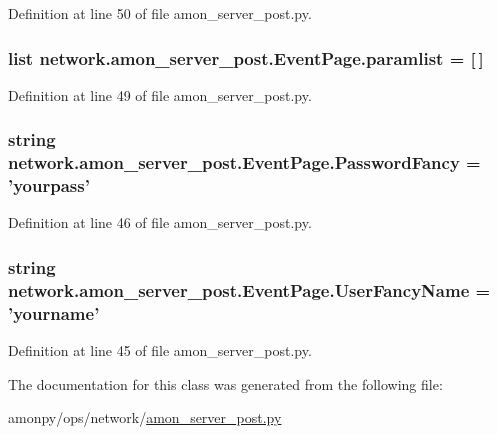 Definition at line 50 of file amon\-\_\-server\-\_\-post.\-py.

\hypertarget{classnetwork_1_1amon__server__post_1_1_event_page_a11cfef0e995347ffe8571f8be4dbc41a}{
\subsubsection[{paramlist}]{\setlength{\rightskip}{0pt plus 5cm}list network.\-amon\-\_\-server\-\_\-post.\-Event\-Page.\-paramlist = \mbox{[}$\,$\mbox{]}\hspace{0.3cm}{\ttfamily [static]}}}\label{classnetwork_1_1amon__server__post_1_1_event_page_a11cfef0e995347ffe8571f8be4dbc41a}


Definition at line 49 of file amon\-\_\-server\-\_\-post.\-py.

\hypertarget{classnetwork_1_1amon__server__post_1_1_event_page_abf3ce23699c9adfa3508cda1192998c1}{
\subsubsection[{Password\-Fancy}]{\setlength{\rightskip}{0pt plus 5cm}string network.\-amon\-\_\-server\-\_\-post.\-Event\-Page.\-Password\-Fancy = 'yourpass'\hspace{0.3cm}{\ttfamily [static]}}}\label{classnetwork_1_1amon__server__post_1_1_event_page_abf3ce23699c9adfa3508cda1192998c1}


Definition at line 46 of file amon\-\_\-server\-\_\-post.\-py.

\hypertarget{classnetwork_1_1amon__server__post_1_1_event_page_a99e287cd9a0c3fa9663a18101606fe7c}{
\subsubsection[{User\-Fancy\-Name}]{\setlength{\rightskip}{0pt plus 5cm}string network.\-amon\-\_\-server\-\_\-post.\-Event\-Page.\-User\-Fancy\-Name = 'yourname'\hspace{0.3cm}{\ttfamily [static]}}}\label{classnetwork_1_1amon__server__post_1_1_event_page_a99e287cd9a0c3fa9663a18101606fe7c}


Definition at line 45 of file amon\-\_\-server\-\_\-post.\-py.



The documentation for this class was generated from the following file\-:\begin{DoxyCompactItemize}
\item 
amonpy/ops/network/\hyperlink{ops_2network_2amon__server__post_8py}{amon\-\_\-server\-\_\-post.\-py}\end{DoxyCompactItemize}
